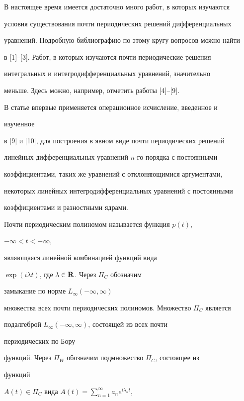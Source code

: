 \label{begin} 


 


В настоящее время имеется достаточно много работ, в которых изучаются  


условия существования почти периодических решений дифференциальных  


уравнений. Подробную библиографию по этому кругу вопросов можно найти  


в [1]--[3]. Работ, в которых изучаются почти периодические решения  


интегральных и интегродифференциальных уравнений, значительно  


меньше. Здесь можно, например, отметить работы [4]--[9]. 


 


В статье впервые применяется операционное исчисление, введенное и 


изученное 


в [9] и [10], для построения в явном виде почти периодических решений 


линейных дифференциальных уравнений $n$-го порядка с постоянными  


коэффициентами, таких же уравнений с отклоняющимися аргументами,  


некоторых линейных интегродифференциальных уравнений с постоянными  


коэффициентами и разностными ядрами. 


 


Почти периодическим полиномом называется функция $p(t)$, 


$-\infty<t<+\infty$, 


являющаяся линейной комбинацией функций вида  


$\exp(i\lambda t)$, где $\lambda\in\bold R$. Через $\Pi_C$ обозначим 


замыкание по норме $L_\infty(-\infty,\infty)$ 


множества всех почти периодических полиномов. Множество $\Pi_C$ является  


подалгеброй $L_\infty(-\infty,\infty)$, состоящей из всех почти 


периодических по Бору 


функций. Через $\Pi_W$ обозначим подмножество $\Pi_C$, состоящее из 


функций 


$A(t)\in\Pi_C$ вида $A(t)=\sum\limits^\infty_{n=1}a_n e^{i\lambda_n t}$, 


